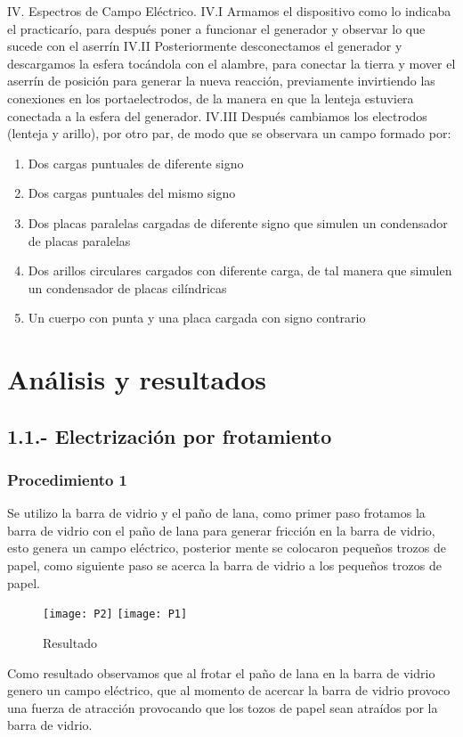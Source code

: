 \documentclass[14pt]{article}
\begin{document}
IV. Espectros de Campo Eléctrico. 
IV.I Armamos el dispositivo como lo indicaba el practicarío, para después poner a funcionar el generador y observar lo que sucede con el aserrín 
IV.II Posteriormente desconectamos el generador y descargamos la esfera tocándola con el alambre, para conectar la tierra y mover el aserrín de posición para generar la nueva reacción, previamente invirtiendo las conexiones en los portaelectrodos, de la manera en que la lenteja estuviera conectada a la esfera del generador. 
IV.III Después cambiamos los electrodos (lenteja y arillo), por otro par, de modo que se observara un campo formado por: 
\begin{enumerate}
	\item Dos cargas puntuales de diferente signo 
	\item Dos cargas puntuales del mismo signo 
	\item Dos placas paralelas cargadas de diferente signo que simulen un condensador de placas paralelas 
	\item Dos arillos circulares cargados con diferente carga, de tal manera que simulen un condensador de placas cilíndricas 
	\item Un cuerpo con punta y una placa cargada con signo contrario 
\end{enumerate}
\section{Análisis y resultados}
\subsection*{1.1.- Electrización por frotamiento}
\subsubsection*{Procedimiento 1}
Se utilizo la barra de vidrio y el paño de lana, como primer paso frotamos la barra de vidrio con el paño de lana para generar fricción en la barra de vidrio, esto genera un campo eléctrico, posterior mente se colocaron pequeños trozos de papel, como siguiente paso se acerca la barra de vidrio a los pequeños trozos de papel.

\begin{figure}[h]
\centering
\texttt{[image: P2]}
\texttt{[image: P1]}
\caption{Resultado}
\end{figure}

Como resultado observamos que al frotar el paño de lana en la barra de vidrio genero un campo eléctrico, que al momento de acercar la barra de vidrio provoco una fuerza de atracción provocando que los tozos de papel sean atraídos por la barra de vidrio.
\end{document}
